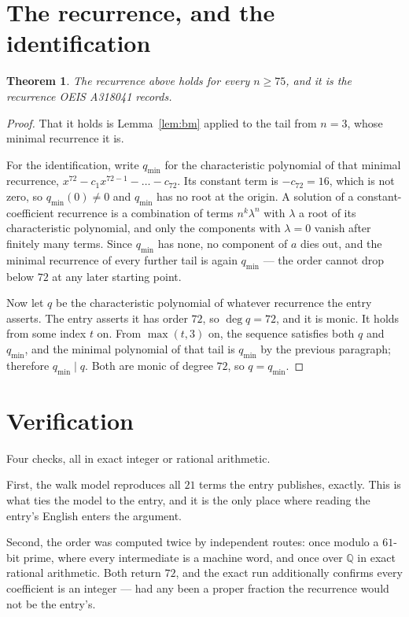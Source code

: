 \documentclass[11pt,a4paper]{article}
\theoremstyle{plain}
\newtheorem{theorem}{Theorem}
\theoremstyle{definition}
\begin{document}
\section{The recurrence, and the identification}

\begin{theorem}
The recurrence above holds for every $n\ge75$, and it is the recurrence OEIS A318041 records.
\end{theorem}

\begin{proof}
That it holds is Lemma~\ref{lem:bm} applied to the tail from $n=3$, whose minimal
recurrence it is.

For the identification, write $q_{\min}$ for the characteristic polynomial of that minimal
recurrence, $x^{72}-c_1x^{72-1}-\dots-c_{72}$. Its constant term is
$-c_{72}=16$, which is not zero, so $q_{\min}(0)\neq0$ and $q_{\min}$ has no
root at the origin. A solution of a constant-coefficient recurrence is a combination of terms
$n^{k}\lambda^{n}$ with $\lambda$ a root of its characteristic polynomial, and only the
components with $\lambda=0$ vanish after finitely many terms. Since $q_{\min}$ has none, no
component of $a$ dies out, and the minimal recurrence of every further tail is again
$q_{\min}$ --- the order cannot drop below $72$ at any later starting point.

Now let $q$ be the characteristic polynomial of whatever recurrence the entry asserts. The
entry asserts it has order $72$, so $\deg q=72$, and it is monic. It holds from some
index $t$ on. From $\max(t,3)$ on, the sequence satisfies both $q$ and $q_{\min}$, and
the minimal polynomial of that tail is $q_{\min}$ by the previous paragraph; therefore
$q_{\min}\mid q$. Both are monic of degree $72$, so $q=q_{\min}$.
\end{proof}

\section{Verification}

Four checks, all in exact integer or rational arithmetic.

First, the walk model reproduces all $21$ terms the entry publishes, exactly. This is
what ties the model to the entry, and it is the only place where reading the entry's English
enters the argument.

Second, the order was computed twice by independent routes: once modulo a $61$-bit prime, where
every intermediate is a machine word, and once over $\mathbb{Q}$ in exact rational arithmetic.
Both return $72$, and the exact run additionally confirms every coefficient is an integer
--- had any been a proper fraction the recurrence would not be the entry's.
\end{document}
